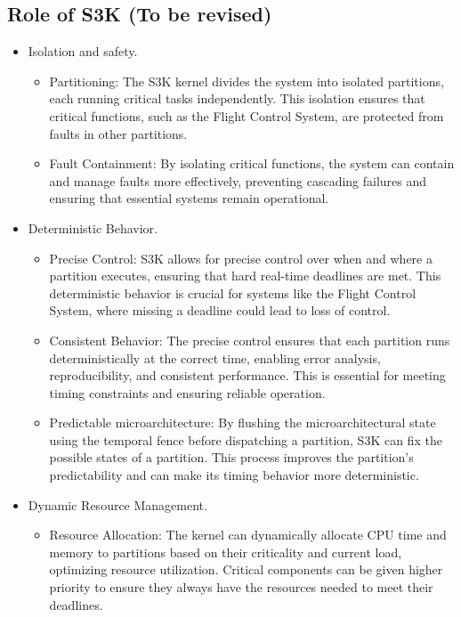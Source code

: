 \subsection{Role of S3K (To be revised)}
\begin{itemize}
	\item Isolation and safety. 

		\begin{itemize}
			\item Partitioning: 
				The S3K kernel divides the system into isolated partitions, each running critical tasks independently. 
				This isolation ensures that critical functions, such as the Flight Control System, are protected from faults in other partitions.
			\item Fault Containment: 
				By isolating critical functions, the system can contain and manage faults more effectively, preventing cascading failures and ensuring that essential systems remain operational.
		\end{itemize}
	\item Deterministic Behavior. 
		\begin{itemize}			
			\item Precise Control: 
				S3K allows for precise control over when and where a partition executes, ensuring that hard real-time deadlines are met. 
				This deterministic behavior is crucial for systems like the Flight Control System, where missing a deadline could lead to loss of control.
			\item Consistent Behavior: 
				The precise control ensures that each partition runs deterministically at the correct time, enabling error analysis, reproducibility, and consistent performance. 
				This is essential for meeting timing constraints and ensuring reliable operation.
			\item Predictable microarchitecture: 
				By flushing the microarchitectural state using the temporal fence before dispatching a partition, S3K can fix the possible states of a partition. 
				This process improves the partition's predictability and can make its timing behavior more deterministic.
		\end{itemize}
	\item Dynamic Resource Management. 
		\begin{itemize}
			\item Resource Allocation: 
				The kernel can dynamically allocate CPU time and memory to partitions based on their criticality and current load, optimizing resource utilization. 
				Critical components can be given higher priority to ensure they always have the resources needed to meet their deadlines.

\end{itemize}
\end{itemize}

